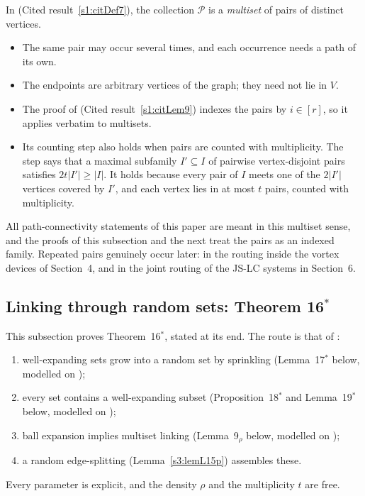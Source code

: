 \begin{remark}[multisets]\label{s3:remMultiset}
In \cite[Definition~7]{BM} (Cited result~\ref{s1:citDef7}), the collection
$\mathcal P$ is a \emph{multiset} of pairs of distinct vertices.
\begin{itemize}
\item The same pair may occur several times, and each occurrence needs a
  path of its own.
\item The endpoints are arbitrary vertices of the graph; they need not
  lie in $V$.
\item The proof of \cite[Lemma~9]{BM} (Cited result~\ref{s1:citLem9}) indexes
  the pairs by $i\in[r]$, so it applies verbatim to multisets.
\item Its counting step also holds when pairs are counted with
  multiplicity. The step says that a maximal subfamily $I'\subseteq I$ of
  pairwise vertex-disjoint pairs satisfies $2t|I'|\ge|I|$. It holds
  because every pair of $I$ meets one of the $2|I'|$ vertices covered by
  $I'$, and each vertex lies in at most $t$ pairs, counted with
  multiplicity.
\end{itemize}
All path-connectivity statements of this paper are meant in this
multiset sense, and the proofs of this subsection and the next treat the
pairs as an indexed family. Repeated pairs genuinely occur later: in the
routing inside the vortex devices of Section~4, and in the joint routing
of the JS-LC systems in Section~6.
\deps{\ref{s1:citDef7}, \ref{s1:citLem9}}
\end{remark}

\subsection{Linking through random sets: Theorem 16\texorpdfstring{$^*$}{*}}

This subsection proves Theorem~16$^*$, stated at its end. The route is
that of \cite[Section~4]{BM}:
\begin{enumerate}
\item well-expanding sets grow into a random set by sprinkling
  (Lemma~17$^*$ below, modelled on \cite[Lemma~17]{BM});
\item every set contains a well-expanding subset (Proposition~18$^*$
  and Lemma~19$^*$ below, modelled on \cite[Proposition~18 and
  Lemma~19]{BM});
\item ball expansion implies multiset linking (Lemma~9$_\rho$ below,
  modelled on \cite[Lemma~9]{BM});
\item a random edge-splitting (Lemma~\ref{s3:lemL15p}) assembles these.
\end{enumerate}
Every parameter is explicit, and the density $\rho$ and the multiplicity
$t$ are free.


